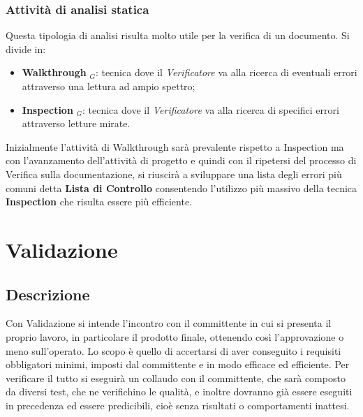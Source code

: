 \subsubsection{Attività di analisi statica}
Questa tipologia di analisi risulta molto utile per la verifica di un documento. Si divide in:
\begin{itemize}
  \item \textbf{Walkthrough} $_G$: tecnica dove il \textit{Verificatore} va alla ricerca di eventuali errori attraverso una lettura ad ampio spettro;
  \item \textbf{Inspection} $_G$: tecnica dove il \textit{Verificatore} va alla ricerca di specifici errori attraverso letture mirate.
\end{itemize}
Inizialmente l'attività di Walkthrough sarà prevalente rispetto a Inspection ma
con l'avanzamento dell'attività di progetto e quindi con il ripetersi del processo di Verifica sulla documentazione, si riuscirà a sviluppare una lista degli errori più comuni detta \textbf{Lista di Controllo} consentendo l'utilizzo più massivo della tecnica \textbf{Inspection} che risulta essere più efficiente.

\section{Validazione}
\subsection{Descrizione}
Con Validazione si intende l'incontro con il committente in cui si presenta il proprio lavoro, in particolare il
prodotto finale, ottenendo così l'approvazione o meno sull'operato. \newline
Lo scopo è quello di accertarsi di aver conseguito i requisiti obbligatori minimi, imposti dal committente e
in modo efficace ed efficiente. Per verificare il tutto si eseguirà un collaudo con il committente, che sarà composto
da diversi test, che ne verifichino le qualità, e inoltre dovranno già essere eseguiti in precedenza ed essere
predicibili, cioè senza risultati o comportamenti inattesi.
